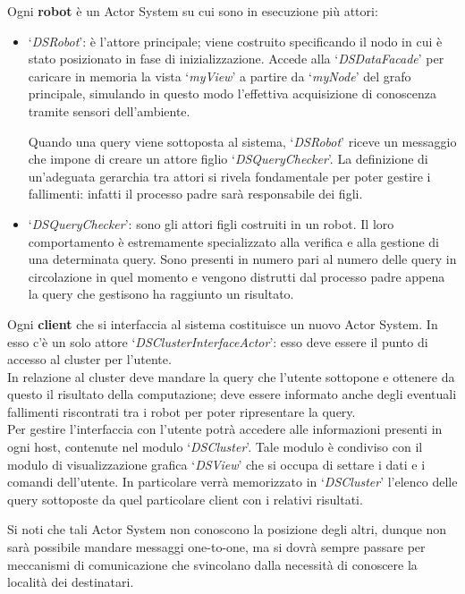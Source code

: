 Ogni \textbf{robot} è un Actor System su cui sono in esecuzione più attori:
\begin{itemize}
\item `\emph{DSRobot}': è l'attore principale; viene costruito specificando
  il nodo in cui è stato posizionato in fase di inizializzazione.
  Accede alla `\emph{DSDataFacade}' per caricare in memoria la vista
  `\emph{myView}' a partire da `\emph{myNode}'
  del grafo principale, simulando in questo modo l'effettiva
  acquisizione di conoscenza tramite sensori dell'ambiente.

  Quando una query viene sottoposta al sistema, `\emph{DSRobot}' riceve
  un messaggio che impone di creare un attore figlio
  `\emph{DSQueryChecker}'.
  La definizione di un'adeguata gerarchia tra attori si rivela fondamentale
  per poter gestire i fallimenti: infatti il processo padre sarà
  responsabile dei figli.
\item `\emph{DSQueryChecker}': sono gli attori figli costruiti in un
  robot. Il loro comportamento è estremamente specializzato alla
  verifica e alla gestione di una determinata query. Sono presenti in numero pari
  al numero delle query in circolazione in quel momento e vengono
  distrutti dal processo padre appena la query che gestisono ha raggiunto
  un risultato.
\end{itemize}

Ogni \textbf{client} che si interfaccia al sistema costituisce un nuovo Actor System.
In esso c'è un solo attore `\emph{DSClusterInterfaceActor}':
esso deve essere il punto di accesso al cluster per l'utente.\\
In relazione al cluster deve mandare la query che l'utente
sottopone e ottenere da questo il risultato della computazione;
deve essere informato anche degli eventuali fallimenti
riscontrati tra i robot per poter ripresentare la query.\\
Per gestire l'interfaccia con l'utente potrà accedere alle informazioni
presenti in ogni host, contenute nel modulo `\emph{DSCluster}'.
Tale modulo è condiviso con il modulo di visualizzazione grafica
`\emph{DSView}' che si occupa di settare i dati e i comandi dell'utente.
In particolare verrà memorizzato in `\emph{DSCluster}' l'elenco delle
query sottoposte da quel particolare client con i relativi
risultati.

Si noti che tali Actor System non conoscono la posizione degli altri,
dunque non sarà possibile mandare messaggi one-to-one,
ma si dovrà sempre passare per meccanismi di comunicazione che svincolano
dalla necessità di conoscere la località dei destinatari.

